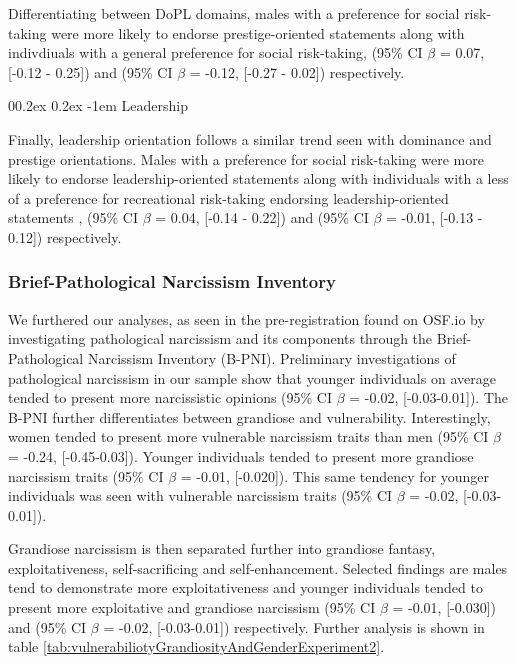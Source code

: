 \documentclass[
  donotrepeattitle,doc, 12pt, a4paper,floatsintext]{apa7}
\makeatletter
\let\oldparagraph\paragraph
\renewcommand{\paragraph}[1]{\oldparagraph{#1}\mbox{}}
\renewcommand{\paragraph}{\@startsection{paragraph}{4}{\parindent}%
  {0\baselineskip \@plus 0.2ex \@minus 0.2ex}%
  {-1em}%
  {\normalfont\normalsize\bfseries\itshape\typesectitle}}
\makeatother
\begin{document}
Differentiating between DoPL domains, males with a preference for social risk-taking were more likely to endorse prestige-oriented statements along with indivdiuals with a general preference for social risk-taking, (95\% CI \(\beta\) = 0.07, {[}-0.12 - 0.25{]}) and (95\% CI \(\beta\) = -0.12, {[}-0.27 - 0.02{]}) respectively.

\hypertarget{leadership-1}{%
\paragraph{Leadership}\label{leadership-1}}

Finally, leadership orientation follows a similar trend seen with dominance and prestige orientations. Males with a preference for social risk-taking were more likely to endorse leadership-oriented statements along with individuals with a less of a preference for recreational risk-taking endorsing leadership-oriented statements , (95\% CI \(\beta\) = 0.04, {[}-0.14 - 0.22{]}) and (95\% CI \(\beta\) = -0.01, {[}-0.13 - 0.12{]}) respectively.

\hypertarget{brief-pathological-narcissism-inventory-1}{%
\subsubsection{Brief-Pathological Narcissism Inventory}\label{brief-pathological-narcissism-inventory-1}}

We furthered our analyses, as seen in the pre-registration found on OSF.io by investigating pathological narcissism and its components through the Brief-Pathological Narcissism Inventory (B-PNI). Preliminary investigations of pathological narcissism in our sample show that younger individuals on average tended to present more narcissistic opinions (95\% CI \(\beta\) = -0.02, {[}-0.03-0.01{]}). The B-PNI further differentiates between grandiose and vulnerability. Interestingly, women tended to present more vulnerable narcissism traits than men (95\% CI \(\beta\) = -0.24, {[}-0.45-0.03{]}). Younger individuals tended to present more grandiose narcissism traits (95\% CI \(\beta\) = -0.01, {[}-0.020{]}). This same tendency for younger individuals was seen with vulnerable narcissism traits (95\% CI \(\beta\) = -0.02, {[}-0.03-0.01{]}).

Grandiose narcissism is then separated further into grandiose fantasy, exploitativeness, self-sacrificing and self-enhancement. Selected findings are males tend to demonstrate more exploitativeness and younger individuals tended to present more exploitative and grandiose narcissism (95\% CI \(\beta\) = -0.01, {[}-0.030{]}) and (95\% CI \(\beta\) = -0.02, {[}-0.03-0.01{]}) respectively. Further analysis is shown in table \ref{tab:vulnerabiliotyGrandiosityAndGenderExperiment2}.
\end{document}
